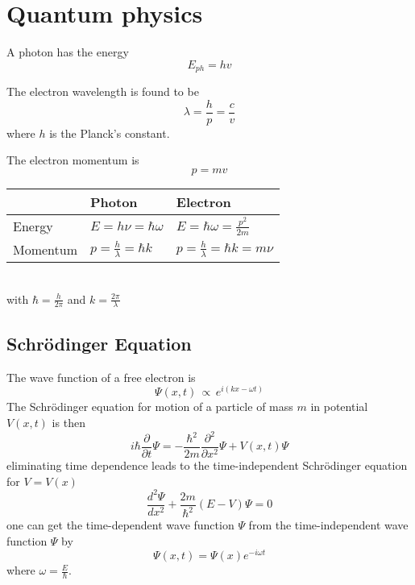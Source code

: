 \section{Quantum physics}

A photon has the energy
\begin{equation}
    E_{ph} = h v
\end{equation}

The electron wavelength is found to be
\begin{equation}
    \lambda = \frac{h}{p} = \frac{c}{v}
\end{equation}
where $h$ is the Planck's constant.

The electron momentum is 
\begin{equation}
    p = m v
\end{equation}

\begin{table}[ht!]
    \centering
    \begin{tabular}{lll}
        & Photon & Electron \\ \toprule
        Energy & $E = h \nu = \hbar \omega$ & $E = \hbar \omega = \frac{p^2}{2m}$ \\
        Momentum & $p = \frac{h}{\lambda} = \hbar k$ & $p = \frac{h}{\lambda} = \hbar k = m \nu$ \\ \bottomrule
    \end{tabular} \\
     with $\hbar = \frac{h}{2\pi}$ and $k = \frac{2\pi}{\lambda}$
\end{table}

\subsection{Schrödinger Equation}
The wave function of a free electron is
\begin{equation}
    \Psi(x,t) \,\propto\, e^{i (kx-\omega t)}
\end{equation}
The Schrödinger equation for motion of a particle of mass $m$ in potential $V(x,t)$ is then
\begin{equation}
    i \hbar \frac{\partial}{\partial t} \Psi = - \frac{\hbar^2}{2m}\frac{\partial^2}{\partial x^2} \Psi + V(x,t) \Psi
\end{equation}
eliminating time dependence leads to the time-independent Schrödinger equation for $V=V(x)$
\begin{equation}
    \frac{d^2 \varPsi}{d x^2} + \frac{2m}{\hbar^2}(E-V) \varPsi = 0
\end{equation}
one can get the time-dependent wave function $\Psi$ from the time-independent wave function $\varPsi$ by
\begin{equation}
    \Psi(x,t) = \varPsi(x) e^{-i \omega t}
\end{equation}
where $\omega = \frac{E}{\hbar}$.

